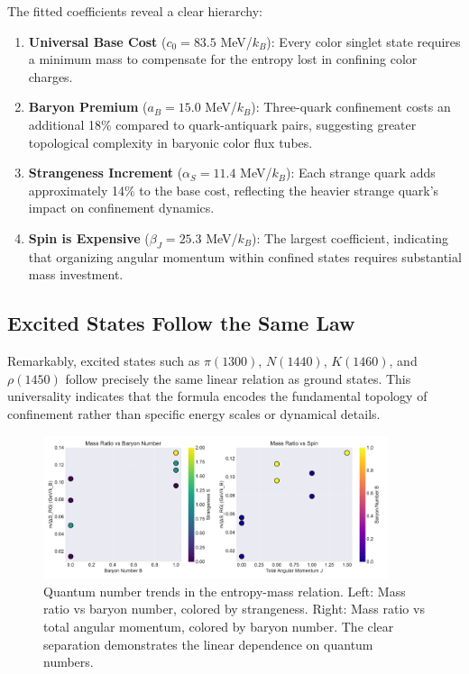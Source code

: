 \documentclass[12pt,a4paper]{article}
\begin{document}
The fitted coefficients reveal a clear hierarchy:

\begin{enumerate}
\item \textbf{Universal Base Cost} ($c_0 = 83.5$ MeV/$k_B$): Every color singlet state requires a minimum mass to compensate for the entropy lost in confining color charges.

\item \textbf{Baryon Premium} ($a_B = 15.0$ MeV/$k_B$): Three-quark confinement costs an additional 18\% compared to quark-antiquark pairs, suggesting greater topological complexity in baryonic color flux tubes.

\item \textbf{Strangeness Increment} ($\alpha_S = 11.4$ MeV/$k_B$): Each strange quark adds approximately 14\% to the base cost, reflecting the heavier strange quark's impact on confinement dynamics.

\item \textbf{Spin is Expensive} ($\beta_J = 25.3$ MeV/$k_B$): The largest coefficient, indicating that organizing angular momentum within confined states requires substantial mass investment.
\end{enumerate}

\subsection{Excited States Follow the Same Law}

Remarkably, excited states such as $\pi(1300)$, $N(1440)$, $K(1460)$, and $\rho(1450)$ follow precisely the same linear relation as ground states. This universality indicates that the formula encodes the fundamental topology of confinement rather than specific energy scales or dynamical details.

\begin{figure}[H]
\centering
\includegraphics[width=0.9\textwidth]{quantum_trends.pdf}
\caption{Quantum number trends in the entropy-mass relation. Left: Mass ratio vs baryon number, colored by strangeness. Right: Mass ratio vs total angular momentum, colored by baryon number. The clear separation demonstrates the linear dependence on quantum numbers.}
\label{fig:trends}
\end{figure}
\end{document}
